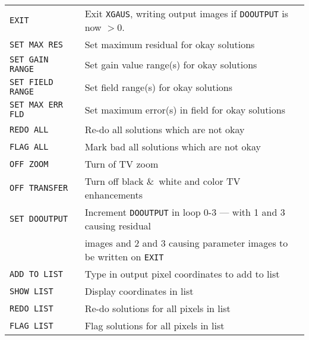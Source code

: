 \documentclass[twoside]{article}
\begin{document}
\begin{center}
\begin{tabular}{|l|l|}\hline
 {\tt EXIT           } & Exit {\tt XGAUS}, writing output images if
                         {\tt DOOUTPUT} is now $> 0.$\\
 {\tt SET MAX RES    } & Set maximum residual for okay solutions\\
 {\tt SET GAIN RANGE } & Set gain value range(s) for okay solutions\\
 {\tt SET FIELD RANGE } & Set field range(s) for okay solutions\\
 {\tt SET MAX ERR FLD} & Set maximum error(s) in field for okay
                         solutions\\
 {\tt REDO ALL       } & Re-do all solutions which are not okay\\
 {\tt FLAG ALL       } & Mark bad all solutions which are not okay\\
 {\tt OFF ZOOM       } & Turn of TV zoom\\
 {\tt OFF TRANSFER   } & Turn off black \&\ white and color TV
                         enhancements\\
 {\tt SET DOOUTPUT   } & Increment {\tt DOOUTPUT} in loop 0-3 --- with
                         1 and 3 causing residual\\
                       & images and 2 and 3 causing parameter images
                         to be written on {\tt EXIT}\\
 {\tt ADD TO LIST    } & Type in output pixel coordinates to add to
                         list\\
 {\tt SHOW LIST      } & Display coordinates in list\\
 {\tt REDO LIST      } & Re-do solutions for all pixels in list\\
 {\tt FLAG LIST      } & Flag solutions for all pixels in list\\ \hline
\end{tabular}
\end{center}
\end{document}
